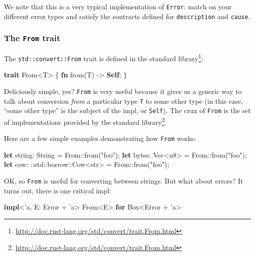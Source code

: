 \documentclass[a4paper,]{book}
\newenvironment{Shaded}{\begin{snugshade}}{\end{snugshade}}
\newcommand{\KeywordTok}[1]{\textcolor[rgb]{0.13,0.29,0.53}{\textbf{{#1}}}}
\newcommand{\DataTypeTok}[1]{\textcolor[rgb]{0.13,0.29,0.53}{{#1}}}
\newcommand{\StringTok}[1]{\textcolor[rgb]{0.31,0.60,0.02}{{#1}}}
\newcommand{\OtherTok}[1]{\textcolor[rgb]{0.56,0.35,0.01}{{#1}}}
\newcommand{\NormalTok}[1]{{#1}}
\renewcommand{\href}[2]{#2\footnote{\url{#1}}}
\begin{document}
We note that this is a very typical implementation of \texttt{Error}:
match on your different error types and satisfy the contracts defined
for \texttt{description} and \texttt{cause}.

\hypertarget{the-from-trait}{\subsubsection{\texorpdfstring{The
\texttt{From} trait}{The From trait}}\label{the-from-trait}}

The \texttt{std::convert::From} trait is
\href{http://doc.rust-lang.org/std/convert/trait.From.html}{defined in
the standard library}:

\protect\hypertarget{code-from-def}{}{}

\begin{Shaded}
\begin{Highlighting}[]
\KeywordTok{trait} \NormalTok{From<T> \{}
    \KeywordTok{fn} \NormalTok{from(T) -> }\KeywordTok{Self}\NormalTok{;}
\NormalTok{\}}
\end{Highlighting}
\end{Shaded}

Deliciously simple, yes? \texttt{From} is very useful because it gives
us a generic way to talk about conversion \emph{from} a particular type
\texttt{T} to some other type (in this case, ``some other type'' is the
subject of the impl, or \texttt{Self}). The crux of \texttt{From} is the
\href{http://doc.rust-lang.org/std/convert/trait.From.html}{set of
implementations provided by the standard library}.

Here are a few simple examples demonstrating how \texttt{From} works:

\begin{Shaded}
\begin{Highlighting}[]
\KeywordTok{let} \NormalTok{string: }\DataTypeTok{String} \NormalTok{= From::from(}\StringTok{"foo"}\NormalTok{);}
\KeywordTok{let} \NormalTok{bytes: }\DataTypeTok{Vec}\NormalTok{<}\DataTypeTok{u8}\NormalTok{> = From::from(}\StringTok{"foo"}\NormalTok{);}
\KeywordTok{let} \NormalTok{cow: ::std::borrow::Cow<}\DataTypeTok{str}\NormalTok{> = From::from(}\StringTok{"foo"}\NormalTok{);}
\end{Highlighting}
\end{Shaded}

OK, so \texttt{From} is useful for converting between strings. But what
about errors? It turns out, there is one critical impl:

\begin{Shaded}
\begin{Highlighting}[]
\KeywordTok{impl}\NormalTok{<}\OtherTok{'a}\NormalTok{, E: Error + }\OtherTok{'a}\NormalTok{> From<E> }\KeywordTok{for} \DataTypeTok{Box}\NormalTok{<Error + }\OtherTok{'a}\NormalTok{>}
\end{Highlighting}
\end{Shaded}
\end{document}
